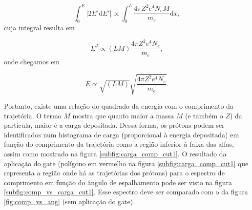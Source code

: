 \documentclass[a4paper,12pt,oneside]{book}
\begin{document}
\begin{equation}\label{eq:bethe_block_low_energies_2}
	\int^{E}_0 \left | 2E'\mathrm{d}E' \right | \propto \int^{L}_0 \frac{4\pi Z^2  e^4 N_e M}{m_e} \mathrm{d}x,
\end{equation}
%
cuja integral resulta em

\begin{equation}\label{eq:bethe_block_low_energies_3}
	E^2 \propto (LM)\frac{4\pi Z^2  e^4 N_e}{m_e},
\end{equation}
%
onde chegamos em

\begin{equation}\label{eq:bethe_block_low_energies_4}
	E \propto \sqrt{(LM)}\sqrt{\frac{4\pi Z^2  e^4 N_e}{m_e}}.
\end{equation}

\par Portanto, existe uma relação do quadrado da energia com o comprimento da trajetória. O termo $M$ mostra que quanto maior a massa $M$ (e também o $Z$) da partícula, maior é a carga depositada. Dessa forma, os prótons podem ser identificados num histograma de carga (proporcional à energia depositada) em função do comprimento da trajetória como a região inferior à faixa das alfas, assim como mostrado na figura \ref{subfig:carga_comp_cut1}. O resultado da aplicação do gate (polígono em vermelho na figura \ref{subfig:carga_comp_cut1} que representa a região onde há as trajetórias dos prótons) para o espectro de comprimento em função do ângulo de espalhamento pode ser visto na figura \ref{subfig:comp_vs_carga_cut1}. Esse espectro deve ser comparado com o da figura \ref{fig:comp_vs_ang} (sem aplicação do gate).

\end{document}
